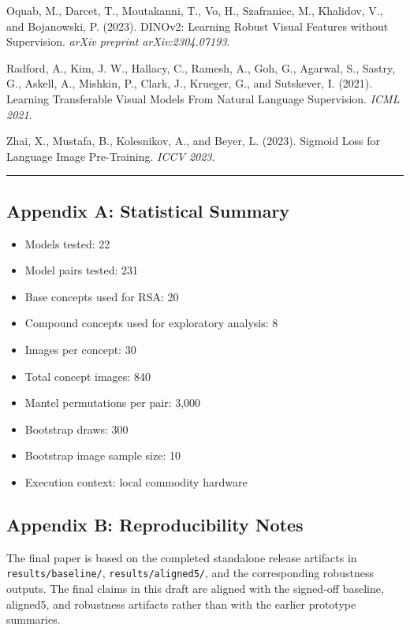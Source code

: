 \documentclass[
]{article}
\providecommand{\tightlist}{%
  \setlength{\itemsep}{0pt}\setlength{\parskip}{0pt}}
\begin{document}
Oquab, M., Darcet, T., Moutakanni, T., Vo, H., Szafraniec, M., Khalidov,
V., and Bojanowski, P. (2023). DINOv2: Learning Robust Visual Features
without Supervision. \emph{arXiv preprint arXiv:2304.07193}.

Radford, A., Kim, J. W., Hallacy, C., Ramesh, A., Goh, G., Agarwal, S.,
Sastry, G., Askell, A., Mishkin, P., Clark, J., Krueger, G., and
Sutskever, I. (2021). Learning Transferable Visual Models From Natural
Language Supervision. \emph{ICML 2021}.

Zhai, X., Mustafa, B., Kolesnikov, A., and Beyer, L. (2023). Sigmoid
Loss for Language Image Pre-Training. \emph{ICCV 2023}.

\begin{center}\rule{0.5\linewidth}{0.5pt}\end{center}

\subsection{Appendix A: Statistical
Summary}\label{appendix-a-statistical-summary}

\begin{itemize}
\tightlist
\item
  Models tested: 22
\item
  Model pairs tested: 231
\item
  Base concepts used for RSA: 20
\item
  Compound concepts used for exploratory analysis: 8
\item
  Images per concept: 30
\item
  Total concept images: 840
\item
  Mantel permutations per pair: 3,000
\item
  Bootstrap draws: 300
\item
  Bootstrap image sample size: 10
\item
  Execution context: local commodity hardware
\end{itemize}

\subsection{Appendix B: Reproducibility
Notes}\label{appendix-b-reproducibility-notes}

The final paper is based on the completed standalone release artifacts
in \texttt{results/baseline/}, \texttt{results/aligned5/}, and the
corresponding robustness outputs. The final claims in this draft are
aligned with the signed-off baseline, aligned5, and robustness
artifacts rather than with the earlier prototype summaries.
\end{document}

